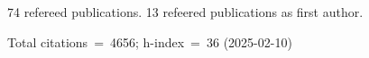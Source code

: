 74 refereed publications. 13 refeered publications as first author.

Total citations~=~4656; h-index~=~36 (2025-02-10)